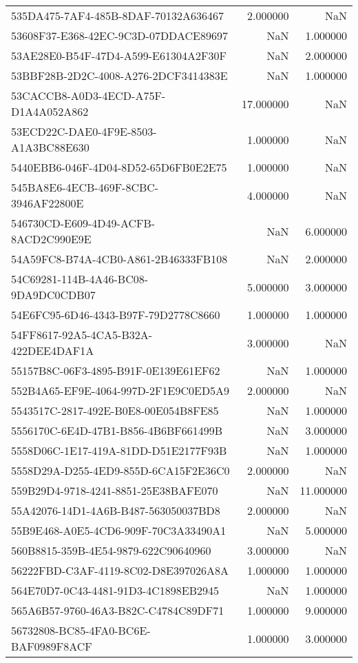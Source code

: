 \begin{tabular}{lrr}
535DA475-7AF4-485B-8DAF-70132A636467 & 2.000000 & NaN \\
53608F37-E368-42EC-9C3D-07DDACE89697 & NaN & 1.000000 \\
53AE28E0-B54F-47D4-A599-E61304A2F30F & NaN & 2.000000 \\
53BBF28B-2D2C-4008-A276-2DCF3414383E & NaN & 1.000000 \\
53CACCB8-A0D3-4ECD-A75F-D1A4A052A862 & 17.000000 & NaN \\
53ECD22C-DAE0-4F9E-8503-A1A3BC88E630 & 1.000000 & NaN \\
5440EBB6-046F-4D04-8D52-65D6FB0E2E75 & 1.000000 & NaN \\
545BA8E6-4ECB-469F-8CBC-3946AF22800E & 4.000000 & NaN \\
546730CD-E609-4D49-ACFB-8ACD2C990E9E & NaN & 6.000000 \\
54A59FC8-B74A-4CB0-A861-2B46333FB108 & NaN & 2.000000 \\
54C69281-114B-4A46-BC08-9DA9DC0CDB07 & 5.000000 & 3.000000 \\
54E6FC95-6D46-4343-B97F-79D2778C8660 & 1.000000 & 1.000000 \\
54FF8617-92A5-4CA5-B32A-422DEE4DAF1A & 3.000000 & NaN \\
55157B8C-06F3-4895-B91F-0E139E61EF62 & NaN & 1.000000 \\
552B4A65-EF9E-4064-997D-2F1E9C0ED5A9 & 2.000000 & NaN \\
5543517C-2817-492E-B0E8-00E054B8FE85 & NaN & 1.000000 \\
5556170C-6E4D-47B1-B856-4B6BF661499B & NaN & 3.000000 \\
5558D06C-1E17-419A-81DD-D51E2177F93B & NaN & 1.000000 \\
5558D29A-D255-4ED9-855D-6CA15F2E36C0 & 2.000000 & NaN \\
559B29D4-9718-4241-8851-25E38BAFE070 & NaN & 11.000000 \\
55A42076-14D1-4A6B-B487-563050037BD8 & 2.000000 & NaN \\
55B9E468-A0E5-4CD6-909F-70C3A33490A1 & NaN & 5.000000 \\
560B8815-359B-4E54-9879-622C90640960 & 3.000000 & NaN \\
56222FBD-C3AF-4119-8C02-D8E397026A8A & 1.000000 & 1.000000 \\
564E70D7-0C43-4481-91D3-4C1898EB2945 & NaN & 1.000000 \\
565A6B57-9760-46A3-B82C-C4784C89DF71 & 1.000000 & 9.000000 \\
56732808-BC85-4FA0-BC6E-BAF0989F8ACF & 1.000000 & 3.000000 \\

\end{tabular}
